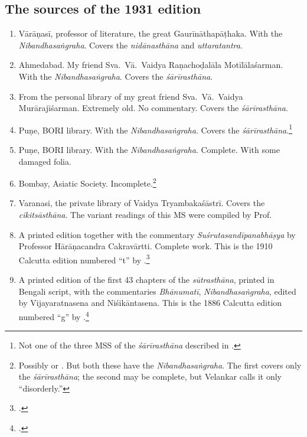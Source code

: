 \subsection{The sources of the 1931 edition}

\begin{enumerate}
    
    \item[1] Vārāṇasī, professor of literature, the great Gaurīnāthapāṭhaka.  With 
    the 
    \emph{Nibandhasaṅgraha}. Covers the \emph{nidānasthāna} and 
    \emph{uttaratantra}.
    
    \item [2]  Ahmedabad.  My friend Sva.\ Vā.\ Vaidya Raṇachoḍalāla 
    Motīlālaśarman.  
    With the \emph{Nibandhasaṅgraha}.  Covers the \emph{śārīrasthāna}.
    
    \item [3] From the personal library of my great friend Sva.\ Vā.\ Vaidya
    Murārajīśarman. Extremely old. No commentary.  Covers the 
    \emph{śārīrasthāna}.
    
    \item [4]  Puṇe, BORI library.  With the \emph{Nibandhasaṅgraha}. Covers the
    \emph{śārīrasthāna}.\footnote{Not one of the three MSS of the
    \emph{śārīrasthāna} described in \cite{shar-vaid}.}
    
    \item [5]  Puṇe, BORI library.  With the \emph{Nibandhasaṅgraha}. Complete.  
    With some damaged folia.
    
    \item [6]  Bombay, Asiatic Society.  Incomplete.\footnote{Possibly 
     or  \citep[v.\,1, \# 212 and 
    213]{vela-1930}.  But both these have the \emph{Nibandhasaṅgraha}.  The 
    first 
    covers only the \emph{śārīrasthāna}; the second may be complete, but 
    Velankar calls it 
    only “disorderly.”}
    
    \item [7] Varanasi, the private library of Vaidya Tryambakaśāstrī.  Covers the 
    \emph{cikitsāsthāna}.  The variant readings of this MS were compiled by Prof.\ 
    
    \item [8]  A printed edition together with the commentary 
    \emph{Suśrutasandīpanabhāṣya} by Professor Hārāṇacandra Cakravārtti. 
    Complete work.
    This is the 1910 Calcutta edition numbered “t” by \citet[IB, 
    312]{meul-hist}.\footcite{bhat-1917}
    
    \item [9] A printed edition of the first 43 chapters of the
    \emph{sūtrasthāna}, printed in Bengali script, with the commentaries
    \emph{Bhānumatī}, \emph{Nibandhasaṅgraha}, edited by Vijayaratnasena and
    Niśikāntasena. This is the 1886 Calcutta edition numbered “g” by \citet[IB,
    311]{meul-hist}.\footcite{sena-1886}
    
\end{enumerate}

